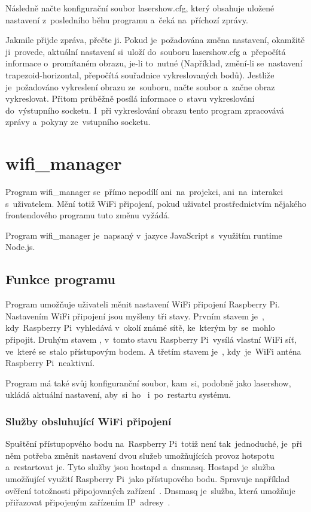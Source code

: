 Následně načte konfigurační soubor lasershow.cfg, který obsahuje uložené nastavení z~posledního běhu programu a~čeká na~příchozí zprávy.

Jakmile přijde zpráva, přečte ji. Pokud je~požadována změna nastavení, okamžitě ji~provede, aktuální nastavení si~uloží do~souboru lasershow.cfg a~přepočítá informace o~promítaném obrazu, je-li to~nutné (Například, změní-li se~nastavení trapezoid-horizontal, přepočítá souřadnice vykreslovaných bodů).
Jestliže je~požadováno vykreslení obrazu ze~souboru, načte soubor a~začne obraz vykreslovat.
Přitom průběžně posílá informace o~stavu vykreslování do~výstupního socketu.
I~při vykreslování obrazu tento program zpracovává zprávy a~pokyny ze~vstupního socketu.

\section{wifi\_manager}

Program wifi\_manager se~přímo nepodílí ani~na~projekci, ani~na~interakci s~uživatelem. Mění totiž WiFi připojení, pokud uživatel prostřednictvím nějakého frontendového programu tuto změnu vyžádá.

Program wifi\_manager je~napsaný v~jazyce JavaScript s~využitím runtime Node.js.

\subsection{Funkce programu}
Program umožňuje uživateli měnit nastavení WiFi připojení Raspberry Pi. Nastavením WiFi připojení jsou myšleny tři stavy.
Prvním stavem je~, kdy~Raspberry Pi~vyhledává v~okolí známé sítě, ke~kterým by~se~mohlo připojit.
Druhým stavem , v~tomto stavu Raspberry Pi~vysílá vlastní WiFi síť, ve~které se~stalo přístupovým bodem.
A třetím stavem je~, kdy~je~WiFi anténa Raspberry Pi~neaktivní.

Program má také svůj konfiguranční soubor, kam~si, podobně jako lasershow, ukládá aktuální nastavení, aby~si~ho~ i~po~restartu systému.

\subsubsection{Služby obsluhující WiFi připojení}
Spuštění přístupopvého bodu na~Raspberry Pi~totiž není tak~jednoduché, je~při něm potřeba změnit nastavení dvou služeb umožňujících provoz hotspotu a~restartovat je. Tyto služby jsou hostapd a~dnsmasq.
Hostapd je~služba umožňující využití Raspberry Pi~jako přístupového bodu. Spravuje například ověření totožnosti připojovaných zařízení~\cite{hostapd}. Dnsmasq je~služba, která umožňuje přiřazovat připojeným zařízením IP~adresy~\cite{dnsmasq}.

